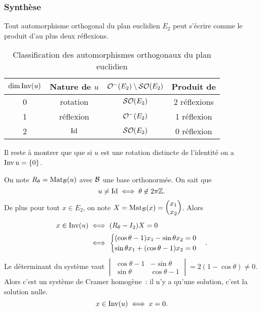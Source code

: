\subsubsection{Synthèse}

\begin{theo}
  Tout automorphisme orthogonal du plan euclidien \(E_2\) peut s'écrire 
  comme le produit d'au plus deux réflexions.
  \begin{table}[!h]
    \centering
    \begin{tabular}{|c|c|c|c|}\hline
      \(\operatorname{dim}\operatorname{Inv}(u)\) & Nature de \(u\) & 
      \(\mathcal{O}^{-}\!\left(E_2\right)\setminus\mathcal{SO}\!\left(E_2\right)\)& Produit de \\ \hline
      0 & rotation & \(\mathcal{SO}\!\left(E_2\right)\) & 2 réflexions \\
      1 & réflexion & \(\mathcal{O}^{-}\!\left(E_2\right)\) & 1 réflexion \\
      2 & \(\operatorname{Id}\) & \(\mathcal{SO}\!\left(E_2\right)\) & 0 réflexion \\ \hline
    \end{tabular}
    \caption{Classification des automorphismes orthogonaux du plan 
    euclidien}
    \label{tab:ClassOrth}
  \end{table}
\end{theo}

Il reste à montrer que  que si \(u\) est une rotation distincte de 
l'identité on a \(\operatorname{Inv} u =\{0\}\). 

On note \(R_\theta=\mathrm{Mat}_{\mathcal{B}}(u)\) avec \(\mathcal{B}\) une base orthonormée. On sait 
que
\begin{equation}
  u \neq \operatorname{Id} \iff \theta \not\in 2\pi\mathbb{Z}.
\end{equation}
De plus pour tout \(x \in E_2\), on note \(X=\mathrm{Mat}_{\mathcal{B}}(x)=\begin{pmatrix} x_1 
\\ x_2 \end{pmatrix}\). Alors
\begin{align}
  x \in \operatorname{Inv}(u) &\iff (R_\theta-I_2)X=0 \\
  &\iff \begin{cases} (\cos\theta -1)x_1 -\sin\theta x_2 = 0 \\ \sin\theta 
  x_1 +(\cos\theta -1)x_2=0 \end{cases}.
\end{align}
Le déterminant du système vaut \(\begin{vmatrix} \cos\theta -1 & -\sin\theta 
\\ \sin\theta & \cos\theta -1\end{vmatrix} = 2(1-\cos\theta)\neq 0\). Alors 
c'est un système de Cramer homogène~: il n'y a qu'une solution, c'est la 
solution nulle.
\begin{equation}
  x \in \operatorname{Inv}(u) \iff x=0.
\end{equation}

